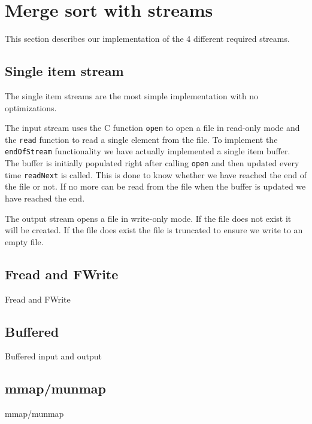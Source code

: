 \section{Merge sort with streams}
This section describes our implementation of the 4 different required streams. 

\subsection{Single item stream}
The single item streams are the most simple implementation with no optimizations.

The input stream uses the C function \texttt{open} to open a file in read-only mode and the \texttt{read} function to read a single element from the file. To implement the \texttt{endOfStream} functionality we have actually implemented a single item buffer. The buffer is initially populated right after calling \texttt{open} and then updated every time \texttt{readNext} is called. This is done to know whether we have reached the end of the file or not. If no more can be read from the file when the buffer is updated we have reached the end.

The output stream opens a file in write-only mode. If the file does not exist it will be created. If the file does exist the file is truncated to ensure we write to an empty file.

\subsection{Fread and FWrite}
Fread and FWrite 


\subsection{Buffered}
Buffered input and output


\subsection{mmap/munmap}
mmap/munmap 
